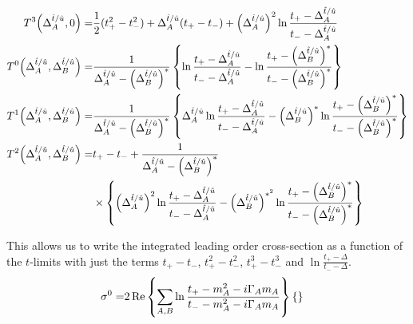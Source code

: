\documentclass[../main.tex]{subfiles}
\begin{document}
\begin{subequations}
\begin{align}
		T^3\!\left(\Delta_A^{\hat{t}/\hat{u}}, 0\right) =                          & \frac{1}{2}(t_+^2 - t_-^2) + \Delta_A^{\hat{t}/\hat{u}}(t_+ - t_-) + \left(\Delta_A^{\hat{t}/\hat{u}}\right)^2 \ln\frac{t_+ - \Delta_A^{\hat{t}/\hat{u}}}{t_- - \Delta_A^{\hat{t}/\hat{u}}}                                                                                                                                                                  \\
		T^0\!\left(\Delta_A^{\hat{t}/\hat{u}}, \Delta_B^{\hat{t}/\hat{u}}\right) = & \frac{1}{\Delta_A^{\hat{t}/\hat{u}} - \left(\Delta_B^{\hat{t}/\hat{u}}\right)^\ast} \left\{\ln\frac{t_+ - \Delta_A^{\hat{t}/\hat{u}}}{t_- - \Delta_A^{\hat{t}/\hat{u}}} - \ln\frac{t_+ - \left(\Delta_B^{\hat{t}/\hat{u}}\right)^\ast}{t_- - \left(\Delta_B^{\hat{t}/\hat{u}}\right)^\ast}\right\}                                                                      \\
		T^1\!\left(\Delta_A^{\hat{t}/\hat{u}}, \Delta_B^{\hat{t}/\hat{u}}\right) = & \frac{1}{\Delta_A^{\hat{t}/\hat{u}} - \left(\Delta_B^{\hat{t}/\hat{u}}\right)^\ast} \left\{\Delta_A^{\hat{t}/\hat{u}} \ln\frac{t_+ - \Delta_A^{\hat{t}/\hat{u}}}{t_- - \Delta_A^{\hat{t}/\hat{u}}} - \left(\Delta_B^{\hat{t}/\hat{u}}\right)^\ast \ln\frac{t_+ - \left(\Delta_B^{\hat{t}/\hat{u}}\right)^\ast}{t_- - \left(\Delta_B^{\hat{t}/\hat{u}}\right)^\ast}\right\} \\
		\nonumber
		T^2\!\left(\Delta_A^{\hat{t}/\hat{u}}, \Delta_B^{\hat{t}/\hat{u}}\right) = & t_+ - t_- + \frac{1}{\Delta_A^{\hat{t}/\hat{u}} - \left(\Delta_B^{\hat{t}/\hat{u}}\right)^\ast}                                                                                                                                                                                                                                                              \\
		                                                                        & \times \left\{\left(\Delta_A^{\hat{t}/\hat{u}}\right)^2 \ln\frac{t_+ - \Delta_A^{\hat{t}/\hat{u}}}{t_- - \Delta_A^{\hat{t}/\hat{u}}} - \left(\Delta_B^{\hat{t}/\hat{u}}\right)^{\ast^2} \ln\frac{t_+ - \left(\Delta_B^{\hat{t}/\hat{u}}\right)^\ast}{t_- - \left(\Delta_B^{\hat{t}/\hat{u}}\right)^\ast}\right\}
	\end{align}
\end{subequations}

This allows us to write the integrated leading order cross-section as a
function of the \(t\)-limits with just the terms \(t_+-t_-\), \(t_+^2-t_-^2\),
\(t_+^3-t_-^3\) and \(\ln\frac{t_+-\Delta}{t_--\Delta}\).
\begin{align}
	\sigma^0 = & 2\operatorname{Re}\left\{\sum_{A,B} \ln\frac{t_+ - m_A^2 - i\Gamma_A m_A}{t_- - m_A^2 - i\Gamma_A m_A}\right\} \left\{\right\}
\end{align}
\end{document}
